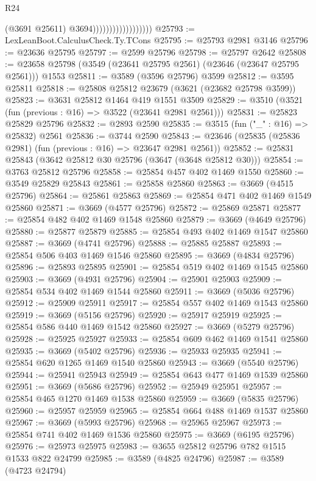 \begin{lexlean}{R24}
\begin{coremodule}
                                        (@3691 @25611)
                                        @3694))))))))))))))))))
@25793 := LexLeanBoot.CalculusCheck.Ty.TCons
@25795 := @25793 @2981 @3146
@25796 := @23636 @25795
@25797 := @2599 @25796
@25798 := @25797 @2642
@25808 := @23658 @25798 (@3549 (@23641 @25795 @2561) (@23646 (@23647 @25795 @2561))) @1553
@25811 := @3589 (@3596 @25796) @3599
@25812 := @3595 @25811
@25818 := @25808 @25812 @23679 (@3621 (@23682 @25798 @3599))
@25823 := @3631 @25812 @1464 @419 @1551 @3509
@25829 := @3510 (@3521 (fun (previous : @16) => @3522 (@23641 @2981 @2561)))
@25831 := @25823 @25829 @25796
@25832 := @2893 @2590
@25835 := @3515 (fun ("_" : @16) => @25832) @2561
@25836 := @3744 @2590
@25843 := @23646 (@25835 (@25836 @2981) (fun (previous : @16) => @23647 @2981 @2561))
@25852 := @25831 @25843 (@3642 @25812 @30 @25796 (@3647 (@3648 @25812 @30)))
@25854 := @3763 @25812 @25796
@25858 := @25854 @457 @402 @1469 @1550
@25860 := @3549 @25829 @25843
@25861 := @25858 @25860
@25863 := @3669 (@4515 @25796)
@25864 := @25861 @25863
@25869 := @25854 @471 @402 @1469 @1549 @25860
@25871 := @3669 (@4577 @25796)
@25872 := @25869 @25871
@25877 := @25854 @482 @402 @1469 @1548 @25860
@25879 := @3669 (@4649 @25796)
@25880 := @25877 @25879
@25885 := @25854 @493 @402 @1469 @1547 @25860
@25887 := @3669 (@4741 @25796)
@25888 := @25885 @25887
@25893 := @25854 @506 @403 @1469 @1546 @25860
@25895 := @3669 (@4834 @25796)
@25896 := @25893 @25895
@25901 := @25854 @519 @402 @1469 @1545 @25860
@25903 := @3669 (@4931 @25796)
@25904 := @25901 @25903
@25909 := @25854 @534 @402 @1469 @1544 @25860
@25911 := @3669 (@5036 @25796)
@25912 := @25909 @25911
@25917 := @25854 @557 @402 @1469 @1543 @25860
@25919 := @3669 (@5156 @25796)
@25920 := @25917 @25919
@25925 := @25854 @586 @440 @1469 @1542 @25860
@25927 := @3669 (@5279 @25796)
@25928 := @25925 @25927
@25933 := @25854 @609 @462 @1469 @1541 @25860
@25935 := @3669 (@5402 @25796)
@25936 := @25933 @25935
@25941 := @25854 @620 @1265 @1469 @1540 @25860
@25943 := @3669 (@5540 @25796)
@25944 := @25941 @25943
@25949 := @25854 @643 @477 @1469 @1539 @25860
@25951 := @3669 (@5686 @25796)
@25952 := @25949 @25951
@25957 := @25854 @465 @1270 @1469 @1538 @25860
@25959 := @3669 (@5835 @25796)
@25960 := @25957 @25959
@25965 := @25854 @664 @488 @1469 @1537 @25860
@25967 := @3669 (@5993 @25796)
@25968 := @25965 @25967
@25973 := @25854 @741 @402 @1469 @1536 @25860
@25975 := @3669 (@6195 @25796)
@25976 := @25973 @25975
@25983 := @3655 @25812 @25796 @782 @1515 @1533 @822 @24799
@25985 := @3589 (@4825 @24796)
@25987 := @3589 (@4723 @24794)

\end{coremodule}
\end{lexlean}
